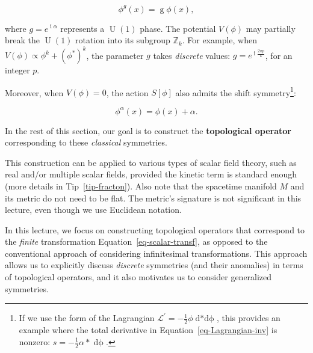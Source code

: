 \documentclass[
  letterpaper,
  DIV=11,
  numbers=noendperiod]{scrreport}
\DeclareMathOperator{\U}{U}
\DeclareMathOperator{\imunit}{i}
\begin{document}
\[
\phi^g(x) = \mathop{g} \phi(x),
\]

where \(g=e^{\imunit \alpha}\) represents a \(\U(1)\) phase. The
potential \(V(\phi)\) may partially break the \(\U(1)\) rotation into
its subgroup \(\mathbb{Z}_k\). For example, when
\(V(\phi)\propto \phi^k+(\phi^*)^k\), the parameter \(g\) takes
\emph{discrete} values: \(g = e^{\imunit \frac{2\pi p}{k}}\), for an
integer \(p\).

Moreover, when \(V(\phi)=0\), the action \(S[\phi]\) also admits the
shift symmetry\footnote{If we use the form of the Lagrangian
  \(\mathcal{L}^\prime= -\frac12 \phi \mathop{d*d\phi}\), this provides
  an example where the total derivative in
  Equation~\ref{eq-Lagrangian-inv} is nonzero:
  \(s=-\frac12 \alpha \mathop{*}\mathop{d\phi}\).}:

\[
\phi^{\alpha}(x) = \phi(x) + \alpha.
\]

In the rest of this section, our goal is to construct the
\textbf{topological operator} corresponding to these \emph{classical}
symmetries.

\begin{tcolorbox}[enhanced jigsaw, breakable, coltitle=black, title=\textcolor{quarto-callout-note-color}{\faInfo}\hspace{0.5em}{Note}, arc=.35mm, leftrule=.75mm, bottomrule=.15mm, colback=white, bottomtitle=1mm, toptitle=1mm, left=2mm, titlerule=0mm, rightrule=.15mm, colbacktitle=quarto-callout-note-color!10!white, colframe=quarto-callout-note-color-frame, opacityback=0, toprule=.15mm, opacitybacktitle=0.6]

This construction can be applied to various types of scalar field
theory, such as real and/or multiple scalar fields, provided the kinetic
term is standard enough (more details in Tip~\ref{tip-fracton}). Also
note that the spacetime manifold \(M\) and its metric do not need to be
flat. The metric's signature is not significant in this lecture, even
though we use Euclidean notation.

\end{tcolorbox}

\begin{tcolorbox}[enhanced jigsaw, breakable, coltitle=black, title=\textcolor{quarto-callout-note-color}{\faInfo}\hspace{0.5em}{Note}, arc=.35mm, leftrule=.75mm, bottomrule=.15mm, colback=white, bottomtitle=1mm, toptitle=1mm, left=2mm, titlerule=0mm, rightrule=.15mm, colbacktitle=quarto-callout-note-color!10!white, colframe=quarto-callout-note-color-frame, opacityback=0, toprule=.15mm, opacitybacktitle=0.6]

In this lecture, we focus on constructing topological operators that
correspond to the \emph{finite} transformation
Equation~\ref{eq-scalar-transf}, as opposed to the conventional approach
of considering infinitesimal transformations. This approach allows us to
explicitly discuss \emph{discrete} symmetries (and their anomalies) in
terms of topological operators, and it also motivates us to consider
generalized symmetries.

\end{tcolorbox}
\end{document}
